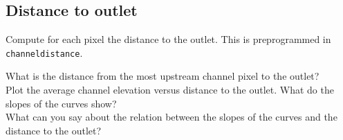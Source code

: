 \documentclass[twocolumn, 10pt, a4paper]{article}
\newenvironment{PC_prac_environment}{
\def\Q{\noindent \color{Gray}\rule[-0.1cm]{\columnwidth}{1.5pt}  \color{black} } \let\ques\Q 
\def\nQ{\noindent \color{black} } \let\ques\nQ 
\def\E{\color{Gray}\rule[0.3cm]{\columnwidth}{1.5pt} \color{black}} \let\ques\E }
\newcommand{\A}[2] { \ifthenelse{\boolean{showanswer}} {\noindent \color{cyan}{#2}\color{black}} {\multido{}{#1}{\noindent \color{light-gray}\hrulefill\\} } }
\begin{document}
\begin{PC_prac_environment}
\subsection{Distance to outlet}
Compute for each pixel the distance to the outlet. This is preprogrammed in \texttt{channeldistance}. 

\Q What is the distance from the most upstream channel pixel to the outlet?\\
\nQ Plot the average channel elevation versus distance to the outlet. What do the slopes of the curves show?\\
\nQ What can you say about the relation between the slopes of the curves and the distance to the outlet?\\
\end{PC_prac_environment}
\end{document}

